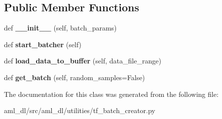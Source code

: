 \subsection*{Public Member Functions}
\begin{DoxyCompactItemize}
\item 
\hypertarget{classsrc_1_1aml__dl_1_1utilities_1_1tf__batch__creator_1_1_batch_creator_a0887b8286baea409f50bba25abfb4f15}{}\label{classsrc_1_1aml__dl_1_1utilities_1_1tf__batch__creator_1_1_batch_creator_a0887b8286baea409f50bba25abfb4f15} 
def {\bfseries \+\_\+\+\_\+init\+\_\+\+\_\+} (self, batch\+\_\+params)
\item 
\hypertarget{classsrc_1_1aml__dl_1_1utilities_1_1tf__batch__creator_1_1_batch_creator_a34c184baba3415e2678f9bc32a94b63e}{}\label{classsrc_1_1aml__dl_1_1utilities_1_1tf__batch__creator_1_1_batch_creator_a34c184baba3415e2678f9bc32a94b63e} 
def {\bfseries start\+\_\+batcher} (self)
\item 
\hypertarget{classsrc_1_1aml__dl_1_1utilities_1_1tf__batch__creator_1_1_batch_creator_adae2fb103245cba876ca1499264d05a9}{}\label{classsrc_1_1aml__dl_1_1utilities_1_1tf__batch__creator_1_1_batch_creator_adae2fb103245cba876ca1499264d05a9} 
def {\bfseries load\+\_\+data\+\_\+to\+\_\+buffer} (self, data\+\_\+file\+\_\+range)
\item 
\hypertarget{classsrc_1_1aml__dl_1_1utilities_1_1tf__batch__creator_1_1_batch_creator_aec9b7930fe9bf94859a9f952863d553e}{}\label{classsrc_1_1aml__dl_1_1utilities_1_1tf__batch__creator_1_1_batch_creator_aec9b7930fe9bf94859a9f952863d553e} 
def {\bfseries get\+\_\+batch} (self, random\+\_\+samples=False)
\end{DoxyCompactItemize}


The documentation for this class was generated from the following file\+:\begin{DoxyCompactItemize}
\item 
aml\+\_\+dl/src/aml\+\_\+dl/utilities/tf\+\_\+batch\+\_\+creator.\+py\end{DoxyCompactItemize}
